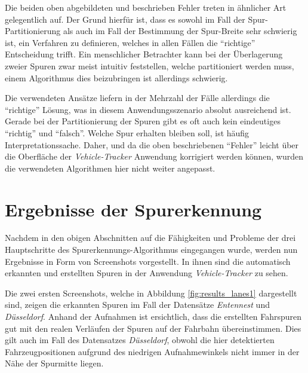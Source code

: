 Die beiden oben abgebildeten und beschrieben Fehler treten in ähnlicher Art gelegentlich auf. Der Grund hierfür
ist, dass es sowohl im Fall der Spur-Partitionierung als auch im Fall der Bestimmung der Spur-Breite sehr schwierig ist,
ein Verfahren zu definieren, welches in allen Fällen die ``richtige'' Entscheidung trifft.
Ein menschlicher Betrachter kann bei der Überlagerung zweier Spuren zwar meist intuitiv feststellen, welche
partitioniert werden muss, einem Algorithmus dies beizubringen ist allerdings schwierig.

Die verwendeten Ansätze liefern in der Mehrzahl der Fälle allerdings die ``richtige'' Lösung, was in diesem Anwendungsszenario
absolut ausreichend ist. Gerade bei der Partitionierung der Spuren gibt es oft auch kein eindeutiges ``richtig'' und ``falsch''.
Welche Spur erhalten bleiben soll, ist häufig Interpretationssache. Daher, und da die oben beschriebenen ``Fehler''
leicht über die Oberfläche der \textit{Vehicle-Tracker} Anwendung korrigiert werden können, wurden die verwendeten
Algorithmen hier nicht weiter angepasst.

\section{Ergebnisse der Spurerkennung}

Nachdem in den obigen Abschnitten auf die Fähigkeiten und Probleme der drei Hauptschritte des
Spurerkennungs-Algorithmus eingegangen wurde, werden nun Ergebnisse in Form von Screenshots vorgestellt.
In ihnen sind die automatisch erkannten und erstellten Spuren in der Anwendung \textit{Vehicle-Tracker} zu sehen.

Die zwei ersten Screenshots, welche in Abbildung \ref{fig:results_lanes1} dargestellt sind, zeigen die erkannten
Spuren im Fall der Datensätze \textit{Entennest} und \textit{Düsseldorf}.
Anhand der Aufnahmen ist ersichtlich, dass die erstellten Fahrspuren gut mit den realen Verläufen der
Spuren auf der Fahrbahn übereinstimmen.
Dies gilt auch im Fall des Datensatzes \textit{Düsseldorf}, obwohl die hier detektierten Fahrzeugpositionen
aufgrund des niedrigen Aufnahmewinkels nicht immer in der Nähe der Spurmitte liegen.

